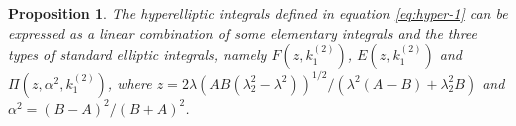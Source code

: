 \documentclass[11pt,reqno]{amsart}
\newcommand{\ii}{\mathrm{i}}
\newcommand{\dd}{\mathrm{d}}
\newtheorem{prop}{Proposition}
\numberwithin{equation}{section}
\begin{document}
%	
%	

\begin{prop}\label{prop:case-1-C}
The hyperelliptic integrals defined in equation \eqref{eq:hyper-1} can be expressed as a linear combination of some elementary integrals and the three types of standard elliptic integrals, namely $F(z,k_1^{(2)})$, $E(z,k_1^{(2)})$ and $\Pi(z,\alpha^2,k_1^{(2)})$, where $z=2\lambda(AB(\lambda_2^2-\lambda^2))^{1/2}/(\lambda^2(A-B)+\lambda_2^2B)$ and $\alpha^2 = (B-A)^2/(B+A)^2$.
\end{prop}
\end{document}
